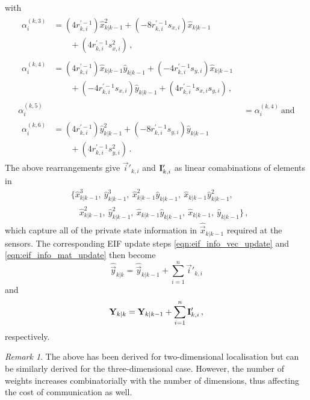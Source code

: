 \documentclass[10pt,letterpaper,oneside,twocolumn,journal]{IEEEtran}
\theoremstyle{definition}
\theoremstyle{definition}
\theoremstyle{remark}
\newtheorem*{remark}{Remark}
\begin{document}
with
\begin{align*}
    \begin{split}
        \alpha_i^{(k,3)} &= (4r_{k,i}^{\prime-1})\hat{x}_{k|k-1}^2 + (-8r_{k,i}^{\prime-1}s_{x,i})\hat{x}_{k|k-1} \\
        &\qquad+ (4r_{k,i}^{\prime-1}s_{x,i}^2)\,,
    \end{split}\\
    \begin{split}
        \alpha_i^{(k,4)} &= (4r_{k,i}^{\prime-1})\hat{x}_{k|k-1}\hat{y}_{k|k-1} + (-4r_{k,i}^{\prime-1}s_{y,i})\hat{x}_{k|k-1}  \\
        &\qquad+ (-4r_{k,i}^{\prime-1}s_{x,i})\hat{y}_{k|k-1} + (4r_{k,i}^{\prime-1}s_{x,i}s_{y,i})\,,
    \end{split}\\
    \alpha_i^{(k,5)} &= \alpha_i^{(k,4)}\ \textrm{and} \\
    \begin{split}
        \alpha_i^{(k,6)} &= (4r_{k,i}^{\prime-1})\hat{y}_{k|k-1}^2 + (-8r_{k,i}^{\prime-1}s_{y,i})\hat{y}_{k|k-1} \\
        &\qquad+ (4r_{k,i}^{\prime-1}s_{y,i}^2)\,.
    \end{split}
\end{align*}
The above rearrangements give $\vec{i}'_{k,i}$ and ${{\mathbf{I}}}'_{k,i}$ as linear comabinations of elements in
\begin{equation}
    \begin{split}
        &\{ \hat{x}_{k|k-1}^3,\ \hat{y}_{k|k-1}^3,\ \hat{x}_{k|k-1}^2\hat{y}_{k|k-1},\ \hat{x}_{k|k-1}\hat{y}_{k|k-1}^2,\\
        &\quad \hat{x}_{k|k-1}^2,\ \hat{y}_{k|k-1}^2,\ \hat{x}_{k|k-1}\hat{y}_{k|k-1},\ \hat{x}_{k|k-1},\ \hat{y}_{k|k-1}\}\,,
    \end{split} \label{eqn:weights_to_broadcast}
\end{equation}
which capture all of the private state information in $\hat{\vec{x}}_{k|k-1}$ required at the sensors. The corresponding EIF update steps \eqref{eqn:eif_info_vec_update} and \eqref{eqn:eif_info_mat_update} then become
\begin{equation}
    \hat{\vec{y}}_{k|k} = \hat{\vec{y}}_{k|k-1} + \sum^n_{i=1}\vec{i}'_{k,i} \label{eqn:eif_modified_vec_update}
\end{equation}
and
\begin{equation}
    \mat{Y}_{k|k} = \mat{Y}_{k|k-1} + \sum^n_{i=1}\mat{I}'_{k,i}\,, \label{eqn:eif_modified_mat_update}
\end{equation}
respectively.
\begin{remark}
    The above has been derived for two-dimensional localisation but can be similarly derived for the three-dimensional case. However, the number of weights increases combinatorially with the number of dimensions, thus affecting the cost of communication as well.
\end{remark}
\end{document}
